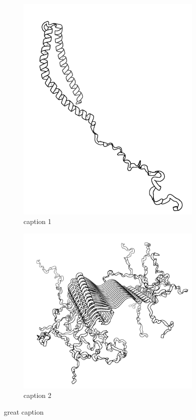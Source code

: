 \begin{figure}[h] %
	\centering
	\begin{subfigure}[t]{0.39\linewidth}
		\includegraphics[width = \textwidth]{pics/alpha_struct.png}
		\caption{caption 1}\label{fig:alpha}
	\end{subfigure}
	\begin{subfigure}[t]{0.6\linewidth}
		\includegraphics[width = \textwidth]{pics/beta_struct.png}
		\caption{caption 2}\label{fig:beta}

	\end{subfigure}
	\caption{great caption}
	\label{fig:structs}
	
\end{figure}
